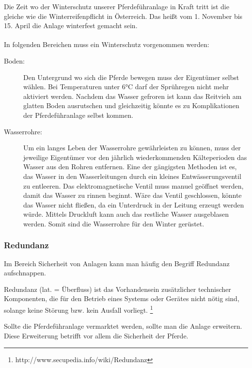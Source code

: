 \documentclass[12pt]{scrartcl}
\begin{document}
Die Zeit wo der Winterschutz unserer Pferdeführanlage in Kraft tritt ist die gleiche wie die Winterreifenpflicht in Österreich. Das heißt vom 1. November bis 15. April die Anlage winterfest gemacht sein. 
\\
\\
In folgenden Bereichen muss ein Winterschutz vorgenommen werden:
\begin{description}
\item[Boden:]
Den Untergrund wo sich die Pferde bewegen muss der Eigentümer selbst wählen. Bei Temperaturen unter 6°C darf der Sprühregen nicht mehr aktiviert werden. Nachdem das Wasser gefroren ist kann das Reitvieh am glatten Boden ausrutschen und gleichzeitig könnte es zu Komplikationen der Pferdeführanlage selbst kommen.

\item[Wasserrohre:]

Um ein langes Leben der Wasserrohre gewährleisten zu können, muss der jeweilige Eigentümer vor den jährlich wiederkommenden Kälteperioden das Wasser aus den Rohren entfernen. Eine der gängigsten Methoden ist es, das Wasser in den Wasserleitungen durch ein kleines Entwässerungsventil zu entleeren. Das elektromagnetische Ventil muss manuel geöffnet werden, damit das Wasser zu rinnen beginnt. Wäre das Ventil geschlossen, könnte das Wasser nicht fließen, da ein Unterdruck in der Leitung erzeugt werden würde. Mittels Druckluft kann auch das restliche Wasser ausgeblasen werden. Somit sind die Wasserrohre für den Winter gerüstet.

\end{description}

\subsubsection{Redundanz}
\label{sec:redundanz}

Im Bereich Sicherheit von Anlagen kann man häufig den Begriff Redundanz aufschnappen. 

 Redundanz (lat. = Überfluss) ist das Vorhandensein zusätzlicher technischer Komponenten, die für den Betrieb eines Systems oder Gerätes nicht nötig sind, solange keine Störung bzw. kein Ausfall vorliegt. \footnote{http://www.secupedia.info/wiki/Redundanz}

Sollte die Pferdeführanlage vermarktet werden, sollte man die Anlage erweitern. Diese Erweiterung betrifft vor allem die Sicherheit der Pferde.
\end{document}
